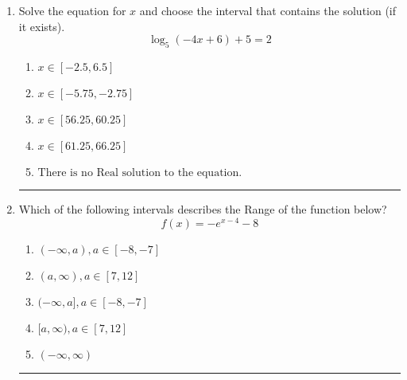 \documentclass[14pt]{extbook}
\newcommand{\litem}[1]{\item#1\hspace*{-1cm}\rule{\textwidth}{0.4pt}}
\begin{document}
\begin{enumerate}
{\begin{enumerate}[label=\Alph*.]
\end{enumerate} }
\litem{
Solve the equation for $x$ and choose the interval that contains the solution (if it exists).\[ \log_{5}{(-4x+6)}+5 = 2 \]\begin{enumerate}[label=\Alph*.]
\item \( x \in [-2.5, 6.5] \)
\item \( x \in [-5.75, -2.75] \)
\item \( x \in [56.25, 60.25] \)
\item \( x \in [61.25, 66.25] \)
\item \( \text{There is no Real solution to the equation.} \)

\end{enumerate} }
\litem{
Which of the following intervals describes the Range of the function below?\[ f(x) = -e^{x-4}-8 \]\begin{enumerate}[label=\Alph*.]
\item \( (-\infty, a), a \in [-8, -7] \)
\item \( (a, \infty), a \in [7, 12] \)
\item \( (-\infty, a], a \in [-8, -7] \)
\item \( [a, \infty), a \in [7, 12] \)
\item \( (-\infty, \infty) \)

\end{enumerate} }
\end{enumerate}
\end{document}
